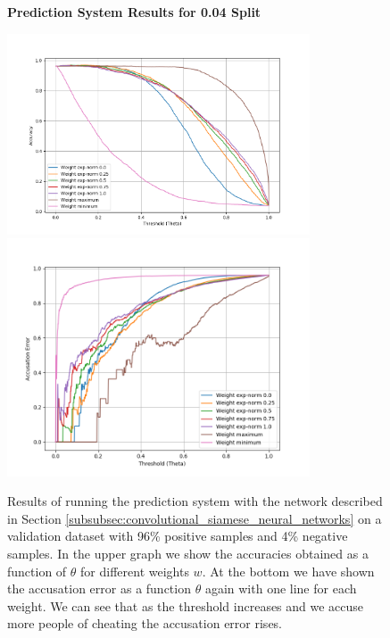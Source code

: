 \begin{figure}
    \centering
    \textbf{Prediction System Results for 0.04 Split}\par\medskip
    \includegraphics[width=0.8\textwidth]{./pictures/experiments/network3_prediction_system_accuracies_4_percent.png}
    \includegraphics[width=0.8\textwidth]{./pictures/experiments/network3_prediction_system_accusation_error_4_percent.png}
    \caption{Results of running the prediction system with the network described
        in Section \ref{subsubsec:convolutional_siamese_neural_networks} on a
        validation dataset with 96\% positive samples and 4\% negative samples.
        In the upper graph we show the accuracies obtained as a function of
        $\theta$ for different weights $w$. At the bottom we have shown the
        accusation error as a function $\theta$ again with one line for each
        weight. We can see that as the threshold increases and we accuse more
        people of cheating the accusation error rises.}
    \label{fig:prediction_system_results_2}
\end{figure}

